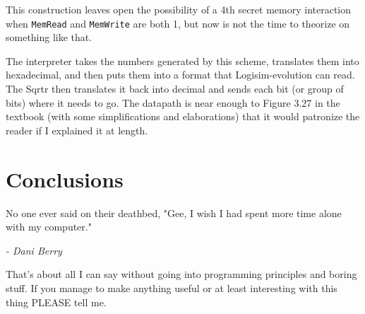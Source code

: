 \documentclass[12pt, oneside]{memoir}
\begin{document}
This construction leaves open the possibility of a 4th secret memory interaction when \texttt{MemRead} and \texttt{MemWrite} are both 1, but now is not the time to theorize on something like that.

The interpreter takes the numbers generated by this scheme, translates them into hexadecimal, and then puts them into a format that Logisim-evolution can read. The Sqrtr then translates it back into decimal and sends each bit (or group of bits) where it needs to go. The datapath is near enough to Figure 3.27 in the textbook (with some simplifications and elaborations) that it would patronize the reader if I explained it at length.

\chapter{Conclusions}
\epigraph{No one ever said on their deathbed, "Gee, I wish I had spent more time alone with my computer."}{\textit{- Dani Berry}}
That's about all I can say without going into programming principles and boring stuff. If you manage to make anything useful or at least interesting with this thing PLEASE tell me.
\end{document}
